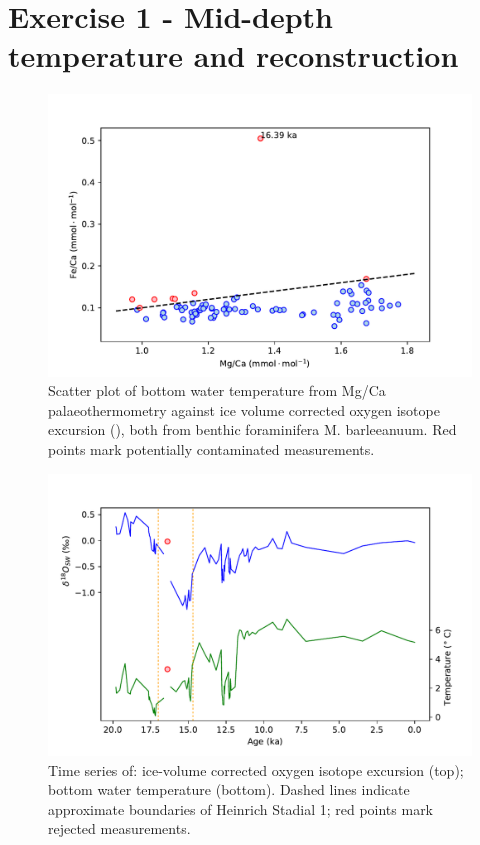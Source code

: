 \section{Exercise 1 - Mid-depth temperature and  reconstruction}

\begin{figure}
\includegraphics[width=\textwidth]{img/scatter_MgCa_x_FeCa_contaminated.pdf}
    \caption{Scatter plot of bottom water temperature from Mg/Ca palaeothermometry against ice volume corrected oxygen isotope excursion (), both from benthic foraminifera M. barleeanuum.
             Red points mark potentially contaminated measurements.}
        \label{fig:Mg_Fe}
\end{figure}

\begin{figure}
\includegraphics[width=\textwidth]{img/timeseries_temp_and_d18Osw.pdf}
    \caption{Time series of: ice-volume corrected oxygen isotope excursion (top); bottom water temperature (bottom).
             Dashed lines indicate approximate boundaries of Heinrich Stadial 1; red points mark rejected measurements.}
        \label{fig:timeseriestempd18Osw}
\end{figure}

